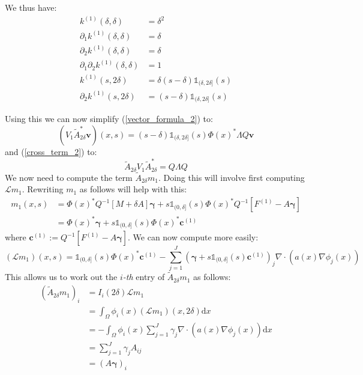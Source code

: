 \documentclass{article}
\theoremstyle{definition}
\theoremstyle{remark}
\theoremstyle{remark}
\begin{document}
\noindent We thus have:
\begin{align*}
    k^{(1)}(\delta,\delta) &= \delta^2 \\
    \partial_{1}k^{(1)}(\delta,\delta) &= \delta \\
    \partial_{2}k^{(1)}(\delta,\delta) &= \delta \\
    \partial_{1}\partial_{2}k^{(1)}(\delta,\delta) &= 1 \\
    k^{(1)}(s,2\delta) &= \delta(s-\delta)\mathbb{1}_{(\delta,2\delta]}(s) \\
    \partial_{2}k^{(1)}(s,2\delta) &= (s-\delta)\mathbb{1}_{(\delta,2\delta]}(s)
\end{align*}

\noindent Using this we can now simplify (\ref{vector_formula_2}) to:
\begin{equation}
  \label{vector_formula_2_simplified}
  (V_{1}\tilde{A}_{2\delta}^{*}\boldsymbol{v})(x,s) = (s-\delta)\mathbb{1}_{(\delta,2\delta]}(s)\Phi(x)^{*}\Lambda Q\boldsymbol{v}
\end{equation}
and (\ref{cross_term_2}) to:
\begin{equation}
  \tilde{A}_{2\delta}V_{1}\tilde{A}_{2\delta}^{*}=Q\Lambda Q
\end{equation}
We now need to compute the term $\tilde{A}_{2\delta}m_1$. Doing this will involve first computing $\mathcal{L}m_{1}$. Rewriting $m_1$ as follows will help with this:
\begin{align*}
  m_1(x,s) &= \Phi(x)^{*}Q^{-1}\left[M+\delta A\right]\boldsymbol{\gamma}+s\mathbb{1}_{(0,\delta]}(s)\Phi(x)^{*}Q^{-1}\left[F^{(1)}-A\boldsymbol{\gamma}\right] \\
  &=\Phi(x)^{*}\boldsymbol{\gamma}+s\mathbb{1}_{(0,\delta]}(s)\Phi(x)^{*}\boldsymbol{c}^{(1)}
\end{align*}
where $\boldsymbol{c}^{(1)}:=Q^{-1}\left[F^{(1)}-A\boldsymbol{\gamma}\right]$.
We can now compute more easily:
\begin{equation*}
  (\mathcal{L}m_{1})(x,s) = \mathbb{1}_{(0,\delta]}(s)\Phi(x)^{*}\boldsymbol{c}^{(1)} - \sum_{j=1}^{J}(\boldsymbol{\gamma}+s\mathbb{1}_{(0,\delta]}(s)\boldsymbol{c}^{(1)})_{j}\nabla\cdot(a(x)\nabla\phi_{j}(x))
\end{equation*}
This allows us to work out the $i$\textit{-th} entry of $\tilde{A}_{2\delta}m_1$ as follows:
\begin{align*}
  (\tilde{A}_{2\delta}m_1)_{i} &= I_{i}(2\delta)\mathcal{L}m_1 \\
  &= \int_{\Omega}\phi_{i}(x)(\mathcal{L}m_1)(x,2\delta)\mathrm{d}x \\
  &= -\int_{\Omega}\phi_{i}(x)\sum_{j=1}^{J}\gamma_{j}\nabla\cdot(a(x)\nabla\phi_j(x))\mathrm{d}x \\
  &= \sum_{j=1}^{J}\gamma_{j}A_{ij} \\
  &= (A\boldsymbol{\gamma})_{i}
\end{align*}
\end{document}
